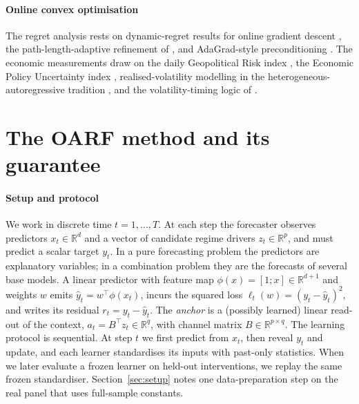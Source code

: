 \documentclass[authoryear,preprint,12pt]{elsarticle}
\theoremstyle{plain}
\theoremstyle{remark}
\newcommand{\R}{\mathbb{R}}
\begin{document}
\paragraph{Online convex optimisation} The regret analysis rests on dynamic-regret
results for online gradient descent \citep{zinkevich2003ogd,hazan2016oco}, the
path-length-adaptive refinement of \citet{zhang2018adaptive}, and AdaGrad-style
preconditioning \citep{duchi2011adagrad}. The economic measurements draw on the
daily Geopolitical Risk index \citep{caldara2022gpr}, the Economic Policy
Uncertainty index \citep{baker2016epu}, realised-volatility modelling in the
heterogeneous-autoregressive tradition \citep{corsi2009har}, and the
volatility-timing logic of \citet{fleming2001voltiming}.

\section{The OARF method and its guarantee}\label{sec:method}

\paragraph{Setup and protocol}
We work in discrete time $t=1,\dots,T$. At each step the forecaster observes
predictors $x_t\in\R^d$ and a vector of candidate regime drivers $z_t\in\R^p$, and
must predict a scalar target $y_t$. In a pure forecasting problem the predictors are
explanatory variables; in a combination problem they are the forecasts of several
base models. A linear predictor with feature map
$\phi(x)=[1;x]\in\R^{d+1}$ and weights $w$ emits $\hat y_t=w^\top\phi(x_t)$, incurs
the squared loss $\ell_t(w)=(y_t-\hat y_t)^2$, and writes its residual
$r_t=y_t-\hat y_t$. The \emph{anchor} is a (possibly learned) linear read-out of the
context, $a_t=B^\top z_t\in\R^q$, with channel matrix $B\in\R^{p\times q}$. The learning protocol is sequential. At step $t$ we first predict from $x_t$, then reveal $y_t$ and update, and each learner standardises its inputs with past-only statistics. When we later evaluate a frozen learner on held-out interventions, we replay the same frozen standardiser. Section~\ref{sec:setup} notes one data-preparation step on the real panel that uses full-sample constants.
\end{document}

